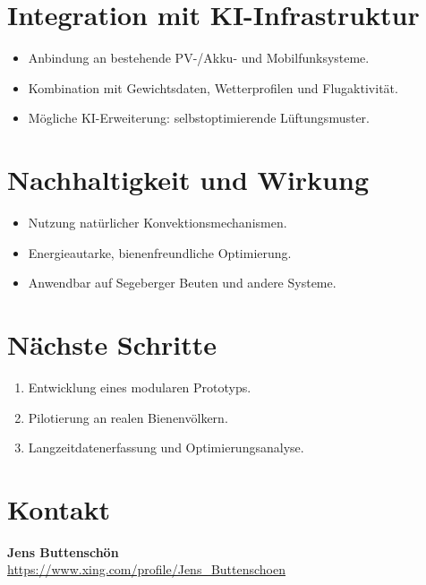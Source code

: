 \documentclass[11pt,a4paper]{article}
\begin{document}
\section{Integration mit KI-Infrastruktur}
\begin{itemize}[topsep=2pt]
  \item Anbindung an bestehende PV-/Akku- und Mobilfunksysteme.
  \item Kombination mit Gewichtsdaten, Wetterprofilen und Flugaktivit\"at.
  \item M\"ogliche KI-Erweiterung: selbstoptimierende L\"uftungsmuster.
\end{itemize}

\section{Nachhaltigkeit und Wirkung}
\begin{itemize}[topsep=2pt]
  \item Nutzung nat\"urlicher Konvektionsmechanismen.
  \item Energieautarke, bienenfreundliche Optimierung.
  \item Anwendbar auf Segeberger Beuten und andere Systeme.
\end{itemize}

\section{N\"achste Schritte}
\begin{enumerate}[topsep=2pt]
  \item Entwicklung eines modularen Prototyps.
  \item Pilotierung an realen Bienenv\"olkern.
  \item Langzeitdatenerfassung und Optimierungsanalyse.
\end{enumerate}

\section*{Kontakt}
\textbf{Jens Buttensch\"on} \\
\small{\url{https://www.xing.com/profile/Jens_Buttenschoen}}
\end{document}
